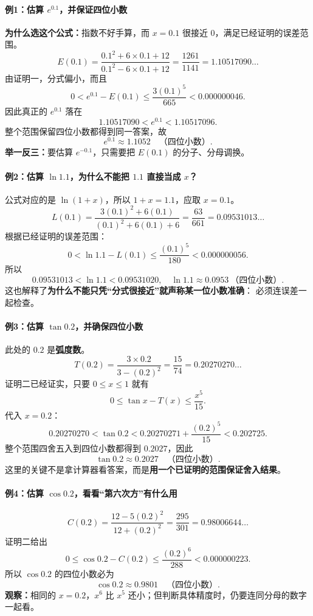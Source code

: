 \clearpage
\begin{examplebox}
\paragraph{例1：估算 $e^{0.1}$，并保证四位小数}
\textbf{为什么选这个公式：}指数不好手算，而 $x=0.1$ 很接近 $0$，满足已经证明的误差范围。
\[
E(0.1)=\frac{0.1^2+6\times0.1+12}{0.1^2-6\times0.1+12}
=\frac{1261}{1141}=1.10517090\ldots
\]
由证明一，分式偏小，而且
\[
0<e^{0.1}-E(0.1)\le\frac{3(0.1)^5}{665}<0.000000046.
\]
因此真正的 $e^{0.1}$ 落在
\[
1.10517090<e^{0.1}<1.10517096.
\]
整个范围保留四位小数都得到同一答案，故
\[
\boxed{e^{0.1}\approx1.1052\quad\text{（四位小数）}.}
\]
\textbf{举一反三：}要估算 $e^{-0.1}$，只需要把 $E(0.1)$ 的分子、分母调换。

\paragraph{例2：估算 $\ln1.1$，为什么不能把 $1.1$ 直接当成 $x$？}
公式对应的是 $\ln(1+x)$，所以 $1+x=1.1$，应取 $x=0.1$。
\[
L(0.1)=\frac{3(0.1)^2+6(0.1)}{(0.1)^2+6(0.1)+6}
=\frac{63}{661}=0.09531013\ldots
\]
根据已经证明的误差范围：
\[
0<\ln1.1-L(0.1)\le\frac{(0.1)^5}{180}<0.000000056.
\]
所以
\[
0.09531013<\ln1.1<0.09531020,
\quad\boxed{\ln1.1\approx0.0953\ \text{（四位小数）}.}
\]
这也解释了\textbf{为什么不能只凭“分式很接近”就声称某一位小数准确}：
必须连误差一起检查。

\newpage
\paragraph{例3：估算 $\tan0.2$，并确保四位小数}
此处的 $0.2$ 是\textbf{弧度数}。
\[
T(0.2)=\frac{3\times0.2}{3-(0.2)^2}
=\frac{15}{74}=0.20270270\ldots
\]
证明二已经证实，只要 $0\le x\le1$ 就有
\[
0\le\tan x-T(x)\le\frac{x^5}{15}.
\]
代入 $x=0.2$：
\[
0.20270270<\tan0.2<0.20270271+\frac{(0.2)^5}{15}
<0.202725.
\]
整个范围四舍五入到四位小数都得到 $0.2027$，因此
\[
\boxed{\tan0.2\approx0.2027\quad\text{（四位小数）}.}
\]
这里的关键不是拿计算器看答案，而是\textbf{用一个已证明的范围保证舍入结果}。

\paragraph{例4：估算 $\cos0.2$，看看“第六次方”有什么用}
\[
C(0.2)=\frac{12-5(0.2)^2}{12+(0.2)^2}
=\frac{295}{301}=0.98006644\ldots
\]
证明二给出
\[
0\le\cos0.2-C(0.2)\le\frac{(0.2)^6}{288}<0.000000223.
\]
所以 $\cos0.2$ 的四位小数必为
\[
\boxed{\cos0.2\approx0.9801\quad\text{（四位小数）}.}
\]
\textbf{观察：}相同的 $x=0.2$，$x^6$ 比 $x^5$ 还小；但判断具体精度时，仍要连同分母的数字一起看。


\end{examplebox}
